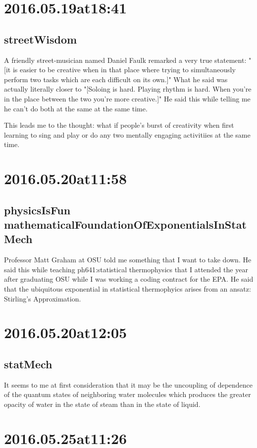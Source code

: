 \begin{enumerate}
\section*{ 2016.05.19at18:41 }
\subsection*{streetWisdom}
A friendly street-musician named Daniel Faulk remarked a very true statement: "[it is easier to be creative when in that place where trying to simultaneously perform two tasks which are each difficult on its own.]" What he said was actually literally closer to "[Soloing is hard. Playing rhythm is hard. When you're in the place between the two you're more creative.]" He said this while telling me he can't do both at the same at the same time.

This leads me to the thought: what if people's burst of creativity when first learning to sing and play or do any two mentally engaging activitiies at the same time.

\section*{ 2016.05.20at11:58 }
\subsection*{physicsIsFun mathematicalFoundationOfExponentialsInStatMech}
Professor Matt Graham at OSU told me something that I want to take down. He said this while teaching ph641:statistical thermophysics that I attended the year after graduating OSU while I was working a coding contract for the EPA. He said that the ubiquitous exponential in statistical thermophyics arises from an ansatz: Stirling's Approximation.

\section*{ 2016.05.20at12:05 }
\subsection*{statMech}
It seems to me at first consideration that it may be the uncoupling of dependence of the quantum states of neighboring water molecules which produces the greater opacity of water in the state of steam than in the state of liquid.

\section*{ 2016.05.25at11:26 }

\end{enumerate}
